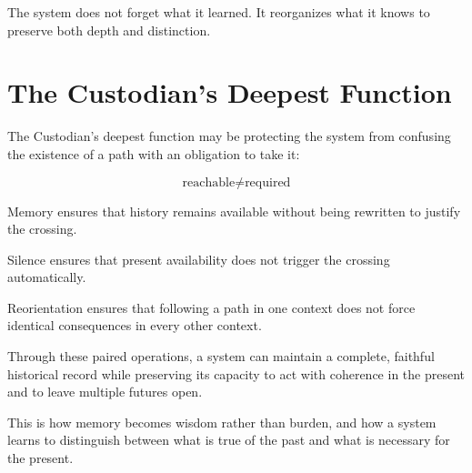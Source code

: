 \documentclass[12pt]{article}
\begin{document}
The system does not forget what it learned. It reorganizes what it knows to preserve both depth and distinction.

\section{The Custodian's Deepest Function}

The Custodian's deepest function may be protecting the system from confusing the existence of a path with an obligation to take it:

\begin{equation}
\boxed{\text{reachable} \neq \text{required}}
\end{equation}

Memory ensures that history remains available without being rewritten to justify the crossing.

Silence ensures that present availability does not trigger the crossing automatically.

Reorientation ensures that following a path in one context does not force identical consequences in every other context.

Through these paired operations, a system can maintain a complete, faithful historical record while preserving its capacity to act with coherence in the present and to leave multiple futures open.

This is how memory becomes wisdom rather than burden, and how a system learns to distinguish between what is true of the past and what is necessary for the present.
\end{document}
